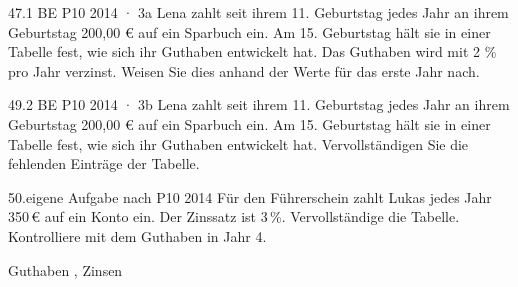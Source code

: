 \documentclass[11pt]{article}
\begin{document}
{\small\begin{pfaufgabe}{47.}{1 BE \textperiodcentered{} P10 2014 · 3a}
Lena zahlt seit ihrem 11. Geburtstag jedes Jahr an ihrem Geburtstag 200,00 € auf ein Sparbuch ein. Am 15. Geburtstag hält sie in einer Tabelle fest, wie sich ihr Guthaben entwickelt hat. Das Guthaben wird mit 2 \% pro Jahr verzinst. Weisen Sie dies anhand der Werte für das erste Jahr nach.
\par\smallskip\noindent {}\par
{}
\end{pfaufgabe}}
\begin{pfaufgabe}{49.}{2 BE \textperiodcentered{} P10 2014 · 3b}
Lena zahlt seit ihrem 11. Geburtstag jedes Jahr an ihrem Geburtstag 200,00 € auf ein Sparbuch ein. Am 15. Geburtstag hält sie in einer Tabelle fest, wie sich ihr Guthaben entwickelt hat. Vervollständigen Sie die fehlenden Einträge der Tabelle.
\par\smallskip\noindent {}\par
{}
\end{pfaufgabe}
\pfweiterekopf
{\small\begin{pfaufgabe}{50.}{eigene Aufgabe nach P10 2014}
Für den Führerschein zahlt Lukas jedes Jahr 350\,€ auf ein Konto ein. Der Zinssatz ist 3\,\%. Vervollständige die Tabelle. Kontrolliere mit dem Guthaben in Jahr 4.
\par\smallskip\noindent {}\par
\par\noindent\hfill Guthaben \leerfeld[€], Zinsen \leerfeld[€]\par
{}
\end{pfaufgabe}}
\end{document}
